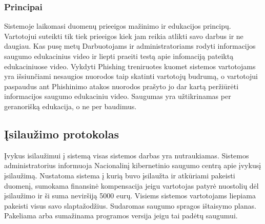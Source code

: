\documentclass{VUMIFPSmagistrinis}
\begin{document}
				\subsubsection{Principai}
					Sistemoje laikomasi duomenų prieeigos mažinimo ir edukacijos principų. 
					Vartotojui suteikti tik tiek prieeigos kiek jam reikia atlikti savo darbus ir ne daugiau.
					Kas pusę metų Darbuotojams ir administratoriams rodyti informacijos saugumo edukacinius video ir liepti praeiti testą apie infomaciją pateiktą edukaciniuose video.
					Vykdyti Phishing treniruotes kuomet sistemos vartotojams yra išsiunčiami nesaugios nuorodos taip skatinti vartotojų budrumą, o vartotojui paspaudus ant Phishinimo atakos nuorodos prašyto jo dar kartą peržiūrėti informacijos saugumo edukaciniu video.
					Saugumas yra užtikrinamas per geranorišką edukacija, o ne per baudimus.

		\subsection{Įsilaužimo protokolas}
			Įvykus isilaužimui į sistemą visas sistemos darbas yra nutraukiamas.
			Sistemos administratorius informuoja Nacionalinį kibernetinio saugumo centrą apie įvykusį įsilaužimą.
			Nustatoma sistema į kurią buvo įsilaužta ir atkūriami pakeisti duomenį, sumokama finansinė kompensacija jeigu vartotojas patyrė nuostolių dėl įsilaužimo ir ši suma neviršiją 5000 eurų.
			Visiems sistemos vartotojams liepiama pakeisti visus savo slaptažodžius.
			Sudaromas saugumo spragos ištaisymo planas.
			Pakeliama arba sumažinama programos versija jeigu tai padėtų saugumui.
	
\end{document}
